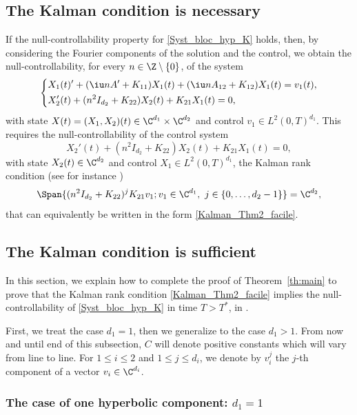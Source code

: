 \subsection{The Kalman condition is necessary}
\label{SectionRequirementKalman}

If the null-controllability property for \eqref{Syst_bloc_hyp_K} holds, then, by
considering the Fourier components of the solution and the control, we obtain the null-controllability, for every $n\in\Z\setminus\{0\}$, of the system
\[
\left\lbrace\begin{aligned}
& X_1(t)'+ (\iu nA'+K_{11})X_1(t) + (\iu nA_{12}+K_{12})X_1(t) = v_1(t), \\
& X_2'(t)+(n^2 I_{d_2}+K_{22})X_2(t)+ K_{21} X_1(t)=0,
\end{aligned}\right.
\]
with state $X(t)=(X_1,X_2)(t)\in\C^{d_1}\times\C^{d_2}$ and control $v_1 \in L^2(0,T)^{d_1}$. This requires the null-controllability of the control system
\[
X_2'(t)+(n^2 I_{d_2}+ K_{22})X_2(t) + K_{21} X_1(t)=0,
\]
with state $X_2(t) \in \C^{d_2}$ and control $X_1 \in L^2(0,T)^{d_1}$, \ie the Kalman rank condition (see for instance \cite[Th.\,1.16]{coron_2007})
\[
\Span\{ (n^2 I_{d_2}+K_{22})^j K_{21} v_1 ; v_1 \in \C^{d_1},\ j \in \{0,\dots,d_2-1\}\}=\C^{d_2},
\]
that can equivalently be written in the form \eqref{Kalman_Thm2_facile}.

\subsection{The Kalman condition is sufficient}
\label{subsec:K_S_K}

In this section, we explain how to complete the proof of Theorem~\ref{th:main} to prove that the Kalman rank condition \eqref{Kalman_Thm2_facile} implies the null-controllability of \eqref{Syst_bloc_hyp_K} in time $T>T^\ast$, in .

First, we treat the case $d_1 = 1$, then we generalize to the case $d_1 >1$. From now and until end of this subsection, $C$ will denote positive constants which will vary from line to line. For $1 \leq i \leq 2$ and $1 \leq j \leq d_i$, we denote by $v_{i}^j$ the $j$-th component of a vector $v_i \in \C^{d_i}$.

\subsubsection{The case of one hyperbolic component: $d_1 = 1$}


